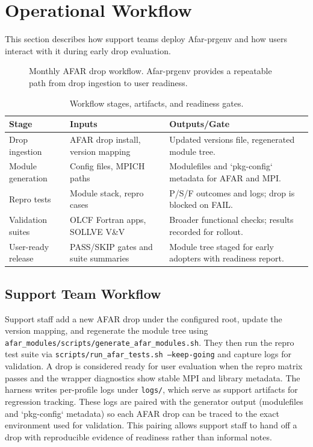 \section{Operational Workflow}
\label{sec:workflow}
This section describes how support teams deploy Afar-prgenv and how users
interact with it during early drop evaluation.

\begin{figure}[t]
  \centering
  
  \caption{Monthly AFAR drop workflow. Afar-prgenv provides a repeatable path
  from drop ingestion to user readiness.}
  \label{fig:workflow}
\end{figure}

\begin{table}[t]
  \centering
  \small
  \setlength{\tabcolsep}{4pt}
  \caption{Workflow stages, artifacts, and readiness gates.}
  \label{tab:workflow-stages}
  \begin{tabular}{p{} p{} p{}}
    \hline
    Stage & Inputs & Outputs/Gate \\
    \hline
    Drop ingestion & AFAR drop install, version mapping & Updated versions file,
    regenerated module tree. \\
    Module generation & Config files, MPICH paths & Modulefiles and
    `pkg-config` metadata for AFAR and MPI. \\
    Repro tests & Module stack, repro cases & P/S/F outcomes and logs; drop is
    blocked on FAIL. \\
    Validation suites & OLCF Fortran apps, SOLLVE V\&V & Broader functional
    checks; results recorded for rollout. \\
    User-ready release & PASS/SKIP gates and suite summaries & Module tree
    staged for early adopters with readiness report. \\
    \hline
  \end{tabular}
\end{table}

\subsection{Support Team Workflow}
\label{sec:support-workflow}
Support staff add a new AFAR drop under the configured root, update the version
mapping, and regenerate the module tree using
\texttt{afar\_modules/scripts/generate\_afar\_modules.sh}. They then run the repro test suite
via \texttt{scripts/run\_afar\_tests.sh --keep-going} and capture logs for validation.
A drop is considered ready for user evaluation when the repro matrix passes
and the wrapper diagnostics show stable MPI and library metadata.
The harness writes per-profile logs under \texttt{logs/}, which serve as
support artifacts for regression tracking.
These logs are paired with the generator output (modulefiles and `pkg-config`
metadata) so each AFAR drop can be traced to the exact environment used for
validation. This pairing allows support staff to hand off a drop with
reproducible evidence of readiness rather than informal notes.

